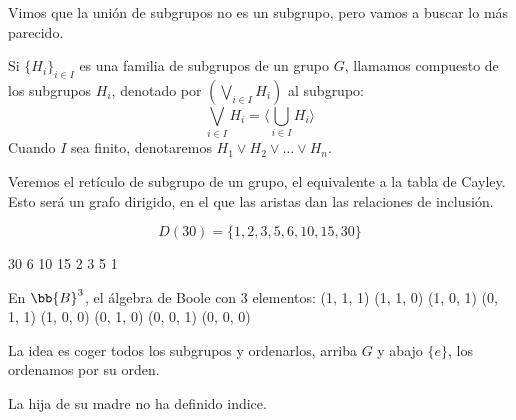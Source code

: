 
Vimos que la unión de subgrupos no es un subgrupo, pero vamos a buscar lo más parecido.

\begin{definicion}[Compuesto]
    Si $\{H_i\}_{i \in I}$ es una familia de subgrupos de un grupo $G$, llamamos compuesto de los subgrupos $H_i$, denotado por $(\bigvee_{i \in I} H_i)$ al subgrupo:
    \begin{equation*}
        \bigvee_{i \in I} H_i = \langle \bigcup_{i \in I} H_i \rangle 
    \end{equation*}
    Cuando $I$ sea finito, denotaremos $H_1\lor H_2 \lor \ldots \lor H_n$.
\end{definicion}

Veremos el retículo de subgrupo de un grupo, el equivalente a la tabla de Cayley. Esto será un grafo dirigido, en el que las aristas dan las relaciones de inclusión.

\begin{equation*}
    D(30) = \{1,2,3,5,6,10,15,30\}
\end{equation*}

30
6 10 15
2 3 5
1

En $\bb{B}^3$, el álgebra de Boole con 3 elementos:
(1, 1, 1)
(1, 1, 0) (1, 0, 1) (0, 1, 1)
(1, 0, 0) (0, 1, 0) (0, 0, 1)
(0, 0, 0)

La idea es coger todos los subgrupos y ordenarlos, arriba $G$ y abajo $\{e\}$, los ordenamos por su orden.

La hija de su madre no ha definido indice.

